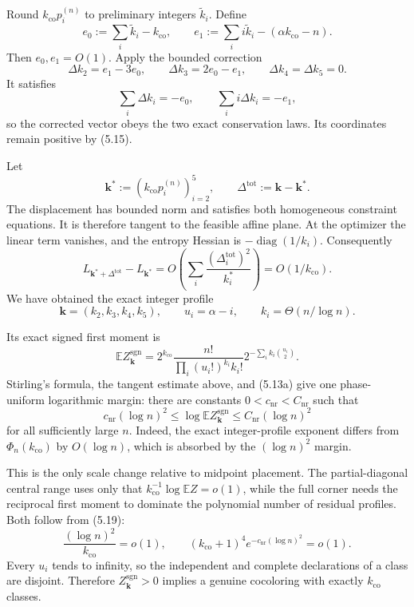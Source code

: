 Round $k_{\mathrm{co}}p_i^{(n)}$ to preliminary integers
$\widetilde k_i$.  Define
\[
  e_0:=\sum_i\widetilde k_i-k_{\mathrm{co}},
  \qquad
  e_1:=\sum_i i\widetilde k_i-(\alpha k_{\mathrm{co}}-n).
\]
Then $e_0,e_1=O(1)$.  Apply the bounded correction
\begin{equation*}
  \Delta k_2=e_1-3e_0,
  \qquad
  \Delta k_3=2e_0-e_1,
  \qquad
  \Delta k_4=\Delta k_5=0.
  \tag{5.16}
\end{equation*}
It satisfies
\[
  \sum_i\Delta k_i=-e_0,
  \qquad
  \sum_i i\Delta k_i=-e_1,
\]
so the corrected vector obeys the two exact conservation laws.  Its
coordinates remain positive by (5.15).

Let
\[
  \mathbf k^*:=(k_{\mathrm{co}}p_i^{(n)})_{i=2}^{5},
  \qquad
  \Delta^{\mathrm{tot}}:=\mathbf k-\mathbf k^*.
\]
The displacement has bounded norm and satisfies both homogeneous constraint
equations.  It is therefore tangent to the feasible affine plane.  At the
optimizer the linear term vanishes, and the entropy Hessian is
$-\operatorname{diag}(1/k_i)$.  Consequently
\[
  L_{\mathbf k^*+\Delta^{\mathrm{tot}}}
  -L_{\mathbf k^*}
  =O\!\left(
    \sum_i\frac{(\Delta_i^{\mathrm{tot}})^2}{k_i^*}
  \right)
  =O(1/k_{\mathrm{co}}).
\]
We have obtained the exact integer profile
\begin{equation*}
  \mathbf k=(k_2,k_3,k_4,k_5),
  \qquad
  u_i=\alpha-i,
  \qquad
  k_i=\Theta(n/\log n).
  \tag{5.17}
\end{equation*}

Its exact signed first moment is
\begin{equation*}
  \mathbb E Z_{\mathbf k}^{\mathrm{sgn}}
  =
  2^{k_{\mathrm{co}}}
  \frac{n!}{\prod_i(u_i!)^{k_i}k_i!}
  2^{-\sum_i k_i\binom{u_i}{2}}.
  \tag{5.18}
\end{equation*}
Stirling's formula, the tangent estimate above, and (5.13a) give one
phase-uniform logarithmic margin: there are constants
$0<c_{\mathrm{nr}}<C_{\mathrm{nr}}$ such that
\begin{equation*}
  c_{\mathrm{nr}}(\log n)^2
  \le
  \log\mathbb E Z_{\mathbf k}^{\mathrm{sgn}}
  \le
  C_{\mathrm{nr}}(\log n)^2
  \tag{5.19}
\end{equation*}
for all sufficiently large $n$.  Indeed, the exact integer-profile exponent
differs from $\Phi_n(k_{\mathrm{co}})$ by $O(\log n)$, which is absorbed by
the $(\log n)^2$ margin.

This is the only scale change relative to midpoint placement.  The
partial-diagonal central range uses only that
$k_{\mathrm{co}}^{-1}\log\mathbb E Z=o(1)$, while the full corner needs the
reciprocal first moment to dominate the polynomial number of residual
profiles.  Both follow from (5.19):
\[
  \frac{(\log n)^2}{k_{\mathrm{co}}}=o(1),
  \qquad
  (k_{\mathrm{co}}+1)^4
  e^{-c_{\mathrm{nr}}(\log n)^2}=o(1).
\]
Every $u_i$ tends to infinity, so the independent and complete declarations
of a class are disjoint.  Therefore
$Z_{\mathbf k}^{\mathrm{sgn}}>0$ implies a genuine cocoloring with exactly
$k_{\mathrm{co}}$ classes.


